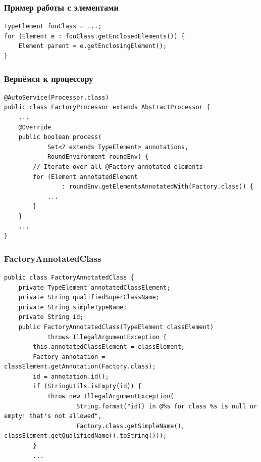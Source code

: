 \documentclass[xetex,mathserif,serif]{beamer}
\begin{document}
	\begin{frame}[fragile]
		\frametitle{Пример работы с элементами}
		\begin{verbatim}
TypeElement fooClass = ...;
for (Element e : fooClass.getEnclosedElements()) {
    Element parent = e.getEnclosingElement();
}
		\end{verbatim}
	\end{frame}

	\begin{frame}[fragile]
		\frametitle{Вернёмся к процессору}
		\begin{verbatim}
@AutoService(Processor.class)
public class FactoryProcessor extends AbstractProcessor {
    ...
    @Override
    public boolean process(
            Set<? extends TypeElement> annotations, 
            RoundEnvironment roundEnv) {
        // Iterate over all @Factory annotated elements
        for (Element annotatedElement 
                : roundEnv.getElementsAnnotatedWith(Factory.class)) {
            ...
        }
    }
    ...
}
		\end{verbatim}
	\end{frame}

	\begin{frame}[fragile]
		\frametitle{FactoryAnnotatedClass}
		\begin{footnotesize}
			\begin{verbatim}
public class FactoryAnnotatedClass {
    private TypeElement annotatedClassElement; 
    private String qualifiedSuperClassName;
    private String simpleTypeName; 
    private String id;
    public FactoryAnnotatedClass(TypeElement classElement) 
            throws IllegalArgumentException {
        this.annotatedClassElement = classElement;
        Factory annotation = classElement.getAnnotation(Factory.class);
        id = annotation.id(); 
        if (StringUtils.isEmpty(id)) {
            throw new IllegalArgumentException(
                    String.format("id() in @%s for class %s is null or empty! that's not allowed",
                    Factory.class.getSimpleName(), classElement.getQualifiedName().toString()));
        }
        ...
			\end{verbatim}
		\end{footnotesize}
	\end{frame}
\end{document}
